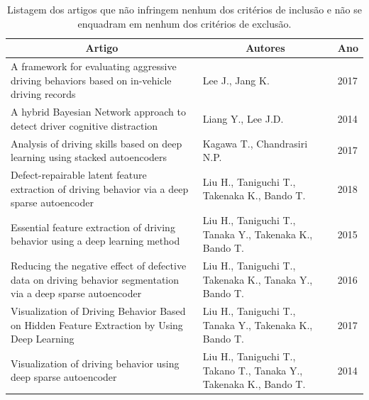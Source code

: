 \documentclass[10pt,journal,compsoc]{IEEEtran}
\begin{document}
\begin{table}[!t]
\renewcommand{\arraystretch}{1.3}
\caption{Listagem dos artigos que não infringem nenhum dos critérios
  de inclusão e não se enquadram em nenhum dos critérios de exclusão.}
\label{tab:artigoslimpos}
\centering
\begin{tabular}{p{10cm}p{5cm}l}
\multicolumn{1}{c}{\textbf{Artigo}}                                                                           & \multicolumn{1}{c}{\textbf{Autores}}                              & \multicolumn{1}{c}{\textbf{Ano}} \\ \hline
A framework for evaluating aggressive driving behaviors based on in-vehicle driving records                   & Lee J., Jang K.                                                   & 2017                             \\
A hybrid Bayesian Network approach to detect driver cognitive distraction                                     & Liang Y., Lee J.D.                                                & 2014                             \\
Analysis of driving skills based on deep learning using stacked autoencoders                                  & Kagawa T., Chandrasiri N.P.                                       & 2017                             \\
Defect-repairable latent feature extraction of driving behavior via a deep sparse autoencoder                 & Liu H., Taniguchi T., Takenaka K., Bando T.                       & 2018                             \\
Essential feature extraction of driving behavior using a deep learning method                                 & Liu H., Taniguchi T., Tanaka Y., Takenaka K., Bando T.            & 2015                             \\
Reducing the negative effect of defective data on driving behavior segmentation via a deep sparse autoencoder & Liu H., Taniguchi T., Takenaka K., Tanaka Y., Bando T.            & 2016                             \\
Visualization of Driving Behavior Based on Hidden Feature Extraction by Using Deep Learning                   & Liu H., Taniguchi T., Tanaka Y., Takenaka K., Bando T.            & 2017                             \\
Visualization of driving behavior using deep sparse autoencoder                                               & Liu H., Taniguchi T., Takano T., Tanaka Y., Takenaka K., Bando T. & 2014                            
\end{tabular}
\end{table}
\end{document}
